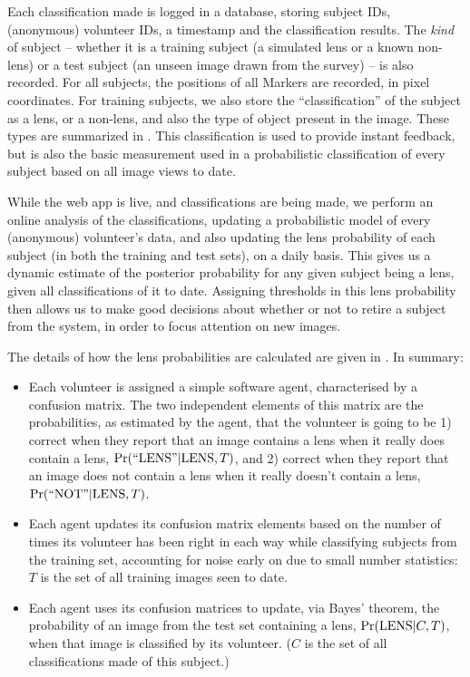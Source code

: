 \documentclass[useAMS,usenatbib,a4paper]{mn2e}
\begin{document}
Each classification made is logged in a database, storing subject IDs,
(anonymous) volunteer IDs, a timestamp and the classification results.  The
{\it kind} of subject -- whether it is a training subject (a simulated lens
or a known non-lens) or a test subject (an unseen image drawn from the survey)
-- is also recorded. For all subjects, the positions of all Markers are
recorded, in pixel coordinates. For training subjects, we also store the
``classification'' of the subject as a lens, or a non-lens, and also the type
of object present in the image. These types are summarized in
.  This classification is used to provide instant
feedback, but is also the basic measurement used in a probabilistic
classification of every subject based on all image views to date.

While the \sw web app is live, and classifications are being made, we 
perform an online analysis of the classifications,  updating a
probabilistic model of every (anonymous) volunteer's data, and also updating
the lens probability of each subject  (in both the training and test sets), on
a daily basis. This gives us a dynamic estimate of the posterior probability
for  any given  subject being a lens, given all classifications of it to date.
Assigning thresholds in this lens probability then allows us to make good
decisions about whether or not to retire a subject from the system, in order to
focus attention on new images. 

The details of how the lens probabilities are calculated are given in
. In summary:
\begin{itemize}

\item Each volunteer is assigned a simple software agent, characterised by a
confusion matrix. The two independent elements of this matrix are the
probabilities, as estimated by the agent, that the volunteer is going to be 1)
correct when they report that an image contains a lens when it really does
contain a lens, ${\rm Pr}({\rm ``LENS"}|{\rm LENS},T)$, and 2) correct when they report that
an image does not contain a lens when it really doesn't contain a lens,
${\rm Pr}({\rm ``NOT"}|{\rm LENS},T)$.

\item Each agent updates its confusion matrix elements based on the number of
times its volunteer has been right in each way while classifying subjects from
the training set, accounting for noise early on due to small number
statistics: $T$ is the set of all training images seen to date.

\item Each agent uses its confusion matrices to update, via Bayes' theorem,
the probability of an image from the test set containing a lens,
${\rm Pr}({\rm LENS}|C,T)$, when that image is classified by its volunteer. ($C$ is the
set of all classifications made of this subject.)

\end{itemize}
\end{document}
